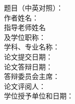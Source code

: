 
\begin{committee}[name={\LARGE 暨南大学学位毕业论文}]
  \vspace{25pt}
  \begin{flushleft}
  {\Large 题目（中英对照）：}\\[30pt]
  {\Large 作者姓名：}  \\[30pt]
  {\Large 指导老师姓名\\ 及学位职称：}  \\[30pt]
  {\Large 学科、专业名称：}  \\[30pt]
  {\Large 论文提交日期：}  \\[30pt]
  {\Large 论文答辩日期：}  \\[30pt]
  {\Large 答辩委员会主席：} \\[30pt]
  {\Large 论文评阅人：}  \\[30pt]
  {\Large 学位授予单位和日期：}  \\[30pt]
  \end{flushleft}
\end{committee}